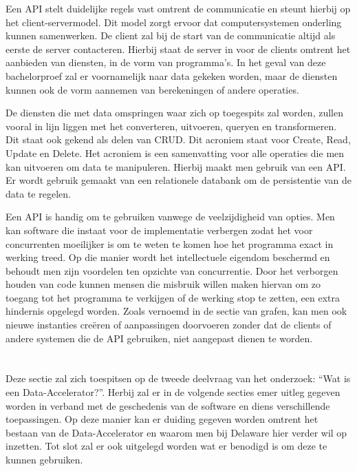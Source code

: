 Een API stelt duidelijke regels vast omtrent de communicatie en steunt hierbij op het client-servermodel. Dit model zorgt ervoor dat computersystemen onderling kunnen samenwerken. De client zal bij de start van de communicatie altijd als eerste de server contacteren. Hierbij staat de server in voor de clients omtrent het aanbieden van diensten, in de vorm van programma's. In het geval van deze bachelorproef zal er voornamelijk naar data gekeken worden, maar de diensten kunnen ook de vorm aannemen van berekeningen of andere operaties.

De diensten die met data omspringen waar zich op toegespits zal worden, zullen vooral in lijn liggen met het converteren, uitvoeren, queryen en transformeren. Dit staat ook gekend als delen van CRUD. Dit acroniem staat voor Create, Read, Update en Delete.\autocite{Martin1983} Het acroniem is een samenvatting voor alle operaties die men kan uitvoeren om data te manipuleren. Hierbij maakt men gebruik van een API. Er wordt gebruik gemaakt van een relationele databank om de persistentie van de data te regelen.

Een API is handig om te gebruiken vanwege de veelzijdigheid van opties. Men kan software die instaat voor de implementatie verbergen zodat het voor concurrenten moeilijker is om te weten te komen hoe het programma exact in werking treed. Op die manier wordt het intellectuele eigendom beschermd en behoudt men zijn voordelen ten opzichte van concurrentie. Door het verborgen houden van code kunnen mensen die misbruik willen maken hiervan om zo toegang tot het programma te verkijgen of de werking stop te zetten, een extra hindernis opgelegd worden. Zoals vernoemd in de sectie van grafen, kan men ook nieuwe instanties creëren of aanpassingen doorvoeren zonder dat de clients of andere systemen die de API gebruiken, niet aangepast dienen te worden.\autocite{Martin2017}

\section{}%
\label{sec:Data-Accelerator}

Deze sectie zal zich toespitsen op de tweede deelvraag van het onderzoek: “Wat is een Data-Accelerator?”. Herbij zal er in de volgende secties emer uitleg gegeven worden in verband met de geschedenis van de software en diens verschillende toepassingen. Op deze manier kan er duiding gegeven worden omtrent het bestaan van de Data-Accelerator en waarom men bij Delaware hier verder wil op inzetten. Tot slot zal er ook uitgelegd worden wat er benodigd is om deze te kunnen gebruiken.

